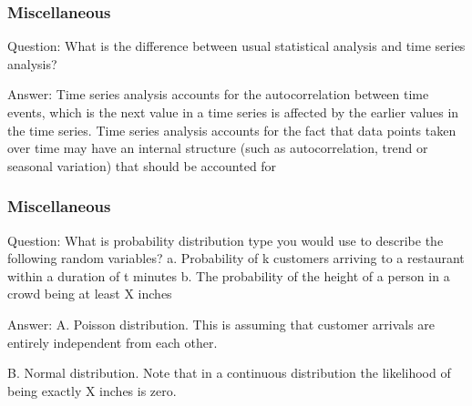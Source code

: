\documentclass[11pt]{beamer}
\begin{document}
\begin{frame}
\frametitle{Miscellaneous}
\begin{block}{Question:}
	What is the difference between usual statistical analysis and time series analysis?  
\end{block}
\begin{block}{Answer:}
	Time series analysis accounts for the autocorrelation between time events, which is the next value in a time series is affected by the earlier values in the time series. Time series analysis accounts for the fact that data points taken over time may have an internal structure (such as autocorrelation, trend or seasonal variation) that should be accounted for
\end{block}
\end{frame}

\begin{frame}
\frametitle{Miscellaneous}
\begin{block}{Question:}
	What is probability distribution type you would use to describe the following random variables?
	a. Probability of k customers arriving to a restaurant within a duration of t minutes
	b. The probability of the height of a person in a crowd being at least X inches
\end{block}
\begin{block}{Answer:}
	A. Poisson distribution. This is assuming that customer arrivals are entirely independent from each other.
	
	B. Normal distribution. Note that in a continuous distribution the likelihood of being exactly X inches is zero.
\end{block}
\end{frame}
\end{document}
